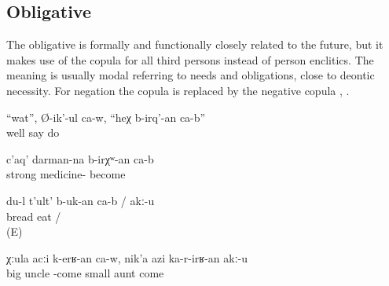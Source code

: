 
\subsection{Obligative}
\label{ssec:Obligative}

The obligative is formally and functionally closely related to the future, but it makes use of the copula for all third persons instead of person enclitics. The meaning is usually modal referring to needs and obligations, close to deontic necessity. For negation the copula  is replaced by the negative copula  , .
%
\begin{exe}
	\ex	\label{ex:Well, he says, this needs to be done}
	\gll	``wat'',	Ø-ik'-ul	ca-w,	``heχ	b-irq'-an	ca-b''	\\
		well	say			do	\\
	\glt	{}


	\ex	\label{ex:It must be a strong medicine}
	\gll	c'aq'	darman-na	b-irχʷ-an	ca-b\\
		strong		medicine-	become	\\
	\glt	{}


	\ex	\label{ex:I have / do not have to eat bread}
	\gll	du-l t'ult' b-uk-an	ca-b	/	akː-u\\
			bread	eat	 /	\\
	\glt	{} (E)
	
	\ex	\label{ex:The elder uncle has to go; the younger aunt should not go}
	\gll	χːula	acːi	k-erʁ-an	ca-w,	nik'a	azi	ka-r-irʁ-an	akː-u\\
		big	uncle	-come		small	aunt	come	\\
	\glt	{}
\end{exe}



